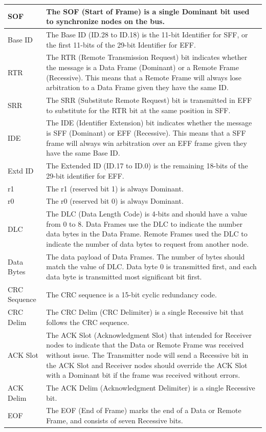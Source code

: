 \documentclass[main\_\_EN.tex]{subfiles}
\begin{document}
\begin{longtable}[c]{|p{3.5cm}|p{12cm}|}
    SOF & The SOF (Start of Frame) is a single Dominant bit used to synchronize nodes on the bus.
          \\\hline
    Base ID & The Base ID (ID.28 to ID.18) is the 11-bit Identifier for SFF, or the first 11-bits of the 29-bit Identifier for EFF.                     \\\hline
    RTR & The RTR (Remote Transmission Request) bit indicates whether the message is a Data Frame (Dominant) or a Remote Frame (Recessive). This means that a Remote Frame will always lose arbitration to a Data Frame given they have the same ID.                                               \\\hline
    SRR & The SRR (Substitute Remote Request) bit is transmitted in EFF to substitute for the RTR bit at the same position in SFF.                       \\\hline
    IDE & The IDE (Identifier Extension) bit indicates whether the message is SFF (Dominant) or EFF (Recessive). This means that a SFF frame will always win arbitration over an EFF frame given they have the same Base ID.                       \\\hline
    Extd ID & The Extended ID (ID.17 to ID.0) is the remaining 18-bits of the 29-bit identifier for EFF.                                                \\\hline
    r1 & The r1 (reserved bit 1) is always Dominant.
             \\\hline
    r0 & The r0 (reserved bit 0) is always Dominant.
             \\\hline
    DLC & The DLC (Data Length Code) is 4-bits and should have a value from 0 to 8. Data Frames use the DLC to indicate the number data bytes in the Data Frame. Remote Frames used the DLC to indicate the number of data bytes to request from another node.
             \\\hline
    Data Bytes & The data payload of Data Frames. The number of bytes should match the value of DLC. Data byte 0 is transmitted first, and each data byte is transmitted most significant bit first.
             \\\hline
    CRC Sequence & The CRC sequence is a 15-bit cyclic redundancy code.
             \\\hline
    CRC Delim & The CRC Delim (CRC Delimiter) is a single Recessive bit that follows the CRC sequence.
              \\\hline
    ACK Slot & The ACK Slot (Acknowledgment Slot) that intended for Receiver nodes to indicate that the Data or Remote Frame was received without issue. The Transmitter node will send a Recessive bit in the ACK Slot and Receiver nodes should override the ACK Slot with a Dominant bit if the frame was received without errors.
              \\\hline
    ACK Delim & The ACK Delim (Acknowledgment Delimiter) is a single Recessive bit.
              \\\hline
    EOF & The EOF (End of Frame) marks the end of a Data or Remote Frame, and consists of seven Recessive bits.
              \\\hline

\end{longtable}
\end{document}
